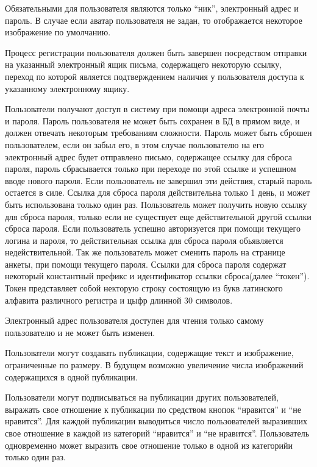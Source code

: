 Обязательными для пользователя являются только ``ник'', электронный адрес и пароль.
В случае если аватар пользователя не задан, то отображается некоторое изображение
по умолчанию.

Процесс регистрации пользователя должен быть завершен посредством отправки на указанный электронный ящик письма,
содержащего некоторую ссылку, переход по которой является подтверждением наличия у пользователя доступа к указанному
электронному ящику.


Пользователи получают доступ в систему при помощи адреса электронной почты и
пароля.
Пароль пользователя не может быть сохранен в БД в прямом виде, и должен отвечать
некоторым требованиям сложности.
Пароль может быть сброшен пользователем, если он забыл его,
в этом случае пользователю на его электронный адрес будет отправлено письмо,
содержащее ссылку для сброса пароля,
пароль сбрасывается только при переходе по этой ссылке
и успешном вводе нового пароля.
Если пользователь не завершил эти действия, старый пароль остается в силе.
Ссылка для сброса пароля действительна только 1 день,
и может быть использована только один раз.
Пользователь может получить новую ссылку для сброса пароля,
только если не существует еще действительной другой ссылки сброса пароля.
Если пользователь успешно авторизуется при помощи текущего логина и пароля, то
действительная ссылка для сброса пароля обьявляется недействительной.
Так же пользователь может сменить пароль на странице анкеты, при помощи текущего пароля.
Ссылки для сброса пароля содержат некоторый константный префикс и идентификатор ссылки сброса(далее ``токен'').
Токен представляет собой некторую строку состоящую из букв латинского
алфавита различного регистра и цыфр длинной 30 символов.

Электронный адрес пользователя доступен для чтения только самому пользователю
и не может быть изменен.

Пользователи могут создавать публикации, содержащие текст и изображение,
ограниченные по размеру.
В будущем возможно увеличение числа изображений содержащихся в одной публикации.



Пользователи могут подписываться на публикации других пользователей, 
выражать свое отношение к публикации по средством кнопок ``нравится'' и 
``не нравится''.
Для каждой публикации выводиться число пользователей выразивших свое отношение
в каждой из категорий ``нравится'' и ``не нравится''.
Пользователь одновременно может выразить свое отношение только в одной из категорийи только один раз.

